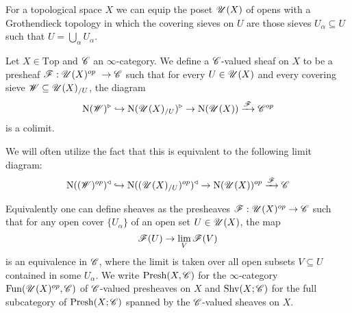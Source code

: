 \documentclass[../../thesis.tex]{subfiles}
\begin{document}
For a topological space $X$ we can equip the poset $\mathscr{U}(X)$ of opens with a Grothendieck topology in which the covering sieves on $U$ are those sieves $U_{\alpha} \subseteq U$ such that $U = \bigcup_{\alpha}U_{\alpha}$.
\begin{definition}\label{sheaf_on_top}
    Let $X \in \mathrm{Top}$ and $\mathscr{C}$ an $\infty$-category.
    We define a $\mathscr{C}$-valued sheaf on $X$ to be a presheaf $\F: \Open(X)^{op} \to \C$ such that for every $U\in \mathscr{U}(X)$ and every covering sieve $\mathscr{W} \subseteq \mathscr{U}(X)_{/U}$, the diagram
    \[
        \mathrm{N}(\mathscr{W})^{\triangleright} \hookrightarrow \mathrm{N}(\mathscr{U}(X)_{/U})^{\triangleright} \rightarrow \mathrm{N}(\mathscr{U}(X))\xrightarrow{\mathscr{F}}\mathscr{C}^{op}
    \]
    is a colimit.
\end{definition}
\begin{remark}
    We will often utilize the fact that this is equivalent to the following limit diagram:
    \[
        \mathrm{N}((\mathscr{W})^{op})^{\triangleleft} \hookrightarrow \mathrm{N}((\mathscr{U}(X)_{/U})^{op})^{\triangleleft} \rightarrow \mathrm{N}(\mathscr{U}(X))^{op}\xrightarrow{\mathscr{F}}\mathscr{C}
    \]
\end{remark}
Equivalently one can define sheaves as the presheaves $\F : \Open(X)^{op} \to \C$ such that for any open cover $\{U_{\alpha}\}$ of an open set $U \in \mathscr{U}(X)$, the map
\[
    \mathscr{F}(U) \to \lim_V \mathscr{F}(V)
\]
is an equivalence in $\mathscr{C}$, where the limit is taken over all open subsets $V\subseteq U$ contained in some $U_{\alpha}$.
We write $\mathrm{Presh}(X, \mathscr{C})$ for the $\infty$-category $\mathrm{Fun}(\mathscr{U}(X)^{op}, \mathscr{C})$ of $\mathscr{C}$-valued presheaves on $X$ and $\mathrm{Shv}(X;\mathscr{C})$ for the full subcategory of $\mathrm{Presh}(X;\mathscr{C})$ spanned by the $\mathscr{C}$-valued sheaves on $X$.
\end{document}

